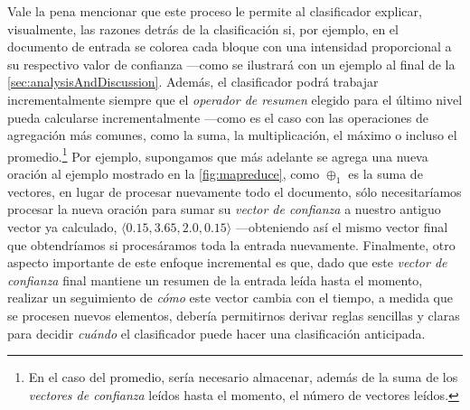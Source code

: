 Vale la pena mencionar que este proceso le permite al clasificador explicar, visualmente, las razones detrás de la clasificación si, por ejemplo, en el documento de entrada se colorea cada bloque con una intensidad proporcional a su respectivo valor de confianza ---como se ilustrará con un ejemplo al final de la \autoref{sec:analysisAndDiscussion}.
Además, el clasificador podrá trabajar incrementalmente siempre que el \emph{operador de resumen} elegido para el último nivel pueda calcularse incrementalmente
---como es el caso con las operaciones de agregación más comunes, como la suma, la multiplicación, el máximo o incluso el promedio.\footnote{En el caso del promedio, sería necesario almacenar, además de la suma de los \emph{vectores de confianza} leídos hasta el momento, el número de vectores leídos.}
Por ejemplo, supongamos que más adelante se agrega una nueva oración al ejemplo mostrado en la \autoref{fig:mapreduce}, como $\oplus_1$ es la suma de vectores, en lugar de procesar nuevamente todo el documento, sólo necesitaríamos procesar la nueva oración para sumar su \emph{vector de confianza} a nuestro antiguo vector ya calculado, $\langle 0.15, 3.65, 2.0, 0.15\rangle$ ---obteniendo así el mismo vector final que obtendríamos si procesáramos toda la entrada nuevamente.
Finalmente, otro aspecto importante de este enfoque incremental es que, dado que este \emph{vector de confianza} final mantiene un resumen de la entrada leída hasta el momento, realizar un seguimiento de \emph{cómo} este vector cambia con el tiempo, a medida que se procesen nuevos elementos, debería permitirnos derivar reglas sencillas y claras para decidir \emph{cuándo} el clasificador puede hacer una clasificación anticipada.
